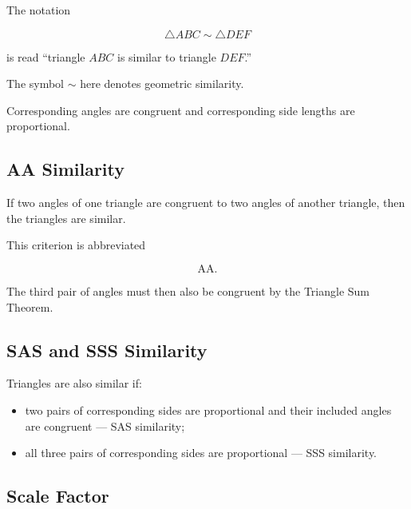 The notation

\[ \triangle ABC\sim\triangle DEF \]

is read ``triangle \(ABC\) is similar to triangle \(DEF\).''

The symbol \(\sim\) here denotes geometric similarity.

Corresponding angles are congruent and corresponding side lengths are
proportional.

\subsection{AA Similarity}
\label{subsec:aa-similarity}

\begin{theorem}
If two angles of one triangle are congruent to two angles of another
triangle, then the triangles are similar.
\end{theorem}

This criterion is abbreviated

\[ \boxed{\mathrm{AA}.} \]

The third pair of angles must then also be congruent by the Triangle Sum
Theorem.

\subsection{SAS and SSS Similarity}
\label{subsec:sas-sss-similarity}

Triangles are also similar if:

\begin{itemize}
    \item two pairs of corresponding sides are proportional and their
    included angles are congruent --- SAS similarity;
    \item all three pairs of corresponding sides are proportional ---
    SSS similarity.
\end{itemize}

\subsection{Scale Factor}
\label{subsec:scale-factor-similarity}

